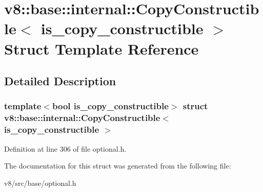 \hypertarget{structv8_1_1base_1_1internal_1_1CopyConstructible}{}\section{v8\+:\+:base\+:\+:internal\+:\+:Copy\+Constructible$<$ is\+\_\+copy\+\_\+constructible $>$ Struct Template Reference}
\label{structv8_1_1base_1_1internal_1_1CopyConstructible}


\subsection{Detailed Description}
\subsubsection*{template$<$bool is\+\_\+copy\+\_\+constructible$>$\newline
struct v8\+::base\+::internal\+::\+Copy\+Constructible$<$ is\+\_\+copy\+\_\+constructible $>$}



Definition at line 306 of file optional.\+h.



The documentation for this struct was generated from the following file\+:\begin{DoxyCompactItemize}
\item 
v8/src/base/optional.\+h\end{DoxyCompactItemize}
